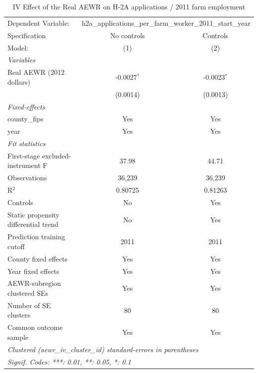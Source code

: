 
\begin{table}[htbp]
   \caption{\label{tab:iv_h2a_applications} IV Effect of the Real AEWR on H-2A applications / 2011 farm employment}
   \centering
   \begin{tabular}{lcc}
      \tabularnewline \midrule \midrule
      Dependent Variable: & \multicolumn{2}{c}{h2a\_applications\_per\_farm\_worker\_2011\_start\_year}\\
      Specification                        & No controls   & Controls \\
      Model:                               & (1)           & (2)\\
      \midrule
      \emph{Variables}\\
      Real AEWR (2012 dollars)             & -0.0027$^{*}$ & -0.0023$^{*}$\\
                                           & (0.0014)      & (0.0013)\\
      \midrule
      \emph{Fixed-effects}\\
      county\_fips                         & Yes           & Yes\\
      year                                 & Yes           & Yes\\
      \midrule
      \emph{Fit statistics}\\
      First-stage excluded-instrument F    & 37.98         & 44.71\\
      Observations                         & 36,239        & 36,239\\
      R$^2$                                & 0.80725       & 0.81263\\
      Controls                             & No            & Yes\\
      Static propensity differential trend & No            & Yes\\
      Prediction training cutoff           & 2011          & 2011\\
      County fixed effects                 & Yes           & Yes\\
      Year fixed effects                   & Yes           & Yes\\
      AEWR-subregion clustered SEs         & Yes           & Yes\\
      Number of SE clusters                & 80            & 80\\
      Common outcome sample                & Yes           & Yes\\
      \midrule \midrule
      \multicolumn{3}{l}{\emph{Clustered (aewr\_iv\_cluster\_id) standard-errors in parentheses}}\\
      \multicolumn{3}{l}{\emph{Signif. Codes: ***: 0.01, **: 0.05, *: 0.1}}\\
   \end{tabular}


\end{table}
